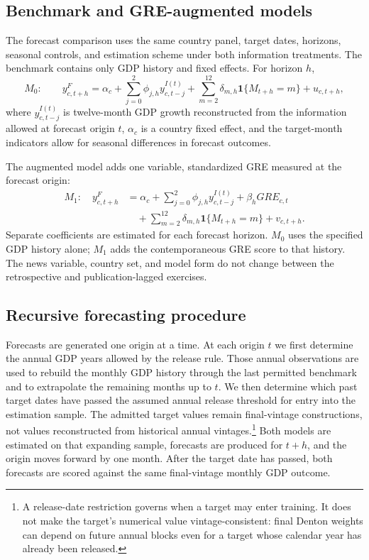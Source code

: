 \documentclass[preprint,12pt,authoryear]{elsarticle}
\begin{document}


\subsection{Benchmark and GRE-augmented models}

The forecast comparison uses the same country panel, target dates, horizons, seasonal controls, and estimation scheme under both information treatments. The benchmark contains only GDP history and fixed effects. For horizon $h$,
\begin{equation}
M_0:\qquad
y^F_{c,t+h}=\alpha_c+\sum_{j=0}^{2}\phi_{j,h}y^{I(t)}_{c,t-j}
+\sum_{m=2}^{12}\delta_{m,h}\mathbf{1}\{M_{t+h}=m\}+u_{c,t+h},
\label{eq:benchmark}
\end{equation}
where $y^{I(t)}_{c,t-j}$ is twelve-month GDP growth reconstructed from the information allowed at forecast origin $t$, $\alpha_c$ is a country fixed effect, and the target-month indicators allow for seasonal differences in forecast outcomes.

The augmented model adds one variable, standardized GRE measured at the forecast origin:
\begin{equation}
\begin{aligned}
M_1:\quad y^F_{c,t+h} &= \alpha_c+\sum_{j=0}^{2}\phi_{j,h}y^{I(t)}_{c,t-j}+\beta_h GRE_{c,t}\\
&\quad +\sum_{m=2}^{12}\delta_{m,h}\mathbf{1}\{M_{t+h}=m\}+v_{c,t+h}.
\end{aligned}
\label{eq:augmented}
\end{equation}
Separate coefficients are estimated for each forecast horizon. $M_0$ uses the specified GDP history alone; $M_1$ adds the contemporaneous GRE score to that history. The news variable, country set, and model form do not change between the retrospective and publication-lagged exercises.

\subsection{Recursive forecasting procedure}

Forecasts are generated one origin at a time. At each origin $t$ we first determine the annual GDP years allowed by the release rule. Those annual observations are used to rebuild the monthly GDP history through the last permitted benchmark and to extrapolate the remaining months up to $t$. We then determine which past target dates have passed the assumed annual release threshold for entry into the estimation sample. The admitted target values remain final-vintage constructions, not values reconstructed from historical annual vintages.\footnote{A release-date restriction governs when a target may enter training. It does not make the target's numerical value vintage-consistent: final Denton weights can depend on future annual blocks even for a target whose calendar year has already been released.} Both models are estimated on that expanding sample, forecasts are produced for $t+h$, and the origin moves forward by one month. After the target date has passed, both forecasts are scored against the same final-vintage monthly GDP outcome.
\end{document}
